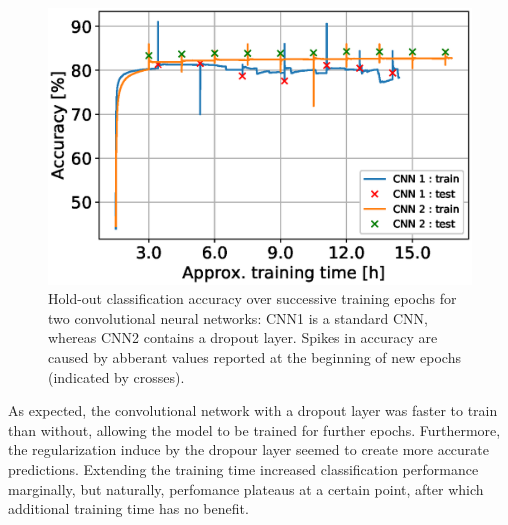 \label{sec:results}
\begin{figure}[h!]
  \centering
  \includegraphics[scale=0.45]{CNNaccuracy}
  \caption{Hold-out classification accuracy over successive training epochs for two convolutional neural networks: CNN1 is a standard CNN, whereas CNN2 contains a dropout layer. Spikes in accuracy are caused by abberant values reported at the beginning of new epochs (indicated by crosses).}
  \label{plot:CNNaccuracy}
\end{figure}
\FloatBarrier

As expected, the convolutional network with a dropout layer was faster to train than without, allowing the model to be trained for further epochs. Furthermore, the regularization induce by the dropour layer seemed to create more accurate predictions. Extending the training time increased classification performance marginally, but naturally, perfomance plateaus at a certain point, after which additional training time has no benefit.
